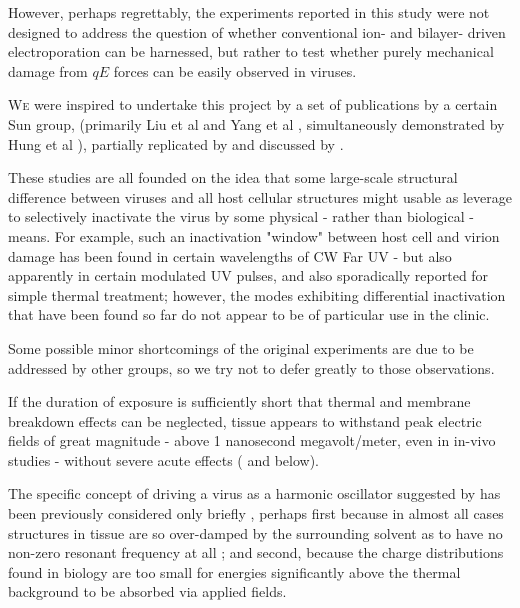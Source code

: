 \documentclass[paper.tex]{subfiles}
\begin{document}
\begin{multicols}{1}
However, perhaps regrettably, the experiments reported in this study were not designed to address the question of whether conventional ion- and bilayer- driven electroporation can be harnessed, but rather to test whether purely mechanical damage from $qE$ forces can be easily observed in viruses. 

\lettrine{W}e were inspired to undertake this project by a set of publications by a certain Sun group, (primarily Liu et al \cite{Microwave2009} and Yang et al \cite{Efficient2015}, simultaneously demonstrated by Hung et al \cite{focusing2014}), partially replicated by \cite{Optical2020} and discussed by \cite{Theoretical2020}.


These studies are all founded on the idea that some large-scale structural difference between viruses and all host cellular structures might usable as leverage to selectively inactivate the virus by some physical - rather than biological - means. For example, such an inactivation "window" between host cell and virion damage has been found in certain wavelengths of CW Far UV\cite{Germicidal2017} - but also apparently in certain modulated UV pulses\cite{Use1987a}\cite{Can1993}, and also sporadically reported for simple thermal treatment\cite{Summary}; however, the modes exhibiting differential inactivation that have been found so far do not appear to be of particular use in the clinic.

Some possible minor shortcomings of the original experiments are due to be addressed by other groups\cite{Generating}, so we try not to defer greatly to those observations.

If the duration of exposure is sufficiently short that thermal and membrane breakdown effects can be neglected, tissue appears to withstand peak electric fields of great magnitude - above 1 nanosecond megavolt/meter, even in in-vivo studies - without severe acute effects (\cite{Repeated2020}\cite{Review2011}\cite{DNA2004} and below).

The specific concept of driving a virus as a harmonic oscillator suggested by \cite{Efficient2015} has been previously considered only briefly \cite{MECHANICAL1968}\cite{Comment2004}\cite{Vibrational2009}\cite{Maximum2010}\cite{Effects1951}, perhaps first because in almost all cases structures in tissue are so over-damped by the surrounding solvent\cite{Vibrational2002}\cite{Biological2002}\cite{Biophysics2000}\cite{Viscous2000} as to have no non-zero resonant frequency at all \cite{dielectric1996}\cite{gabriel1996compilation}; and second, because the charge distributions found in biology are too small for energies significantly above the thermal background to be absorbed via applied fields. 


\end{multicols}
\end{document}
